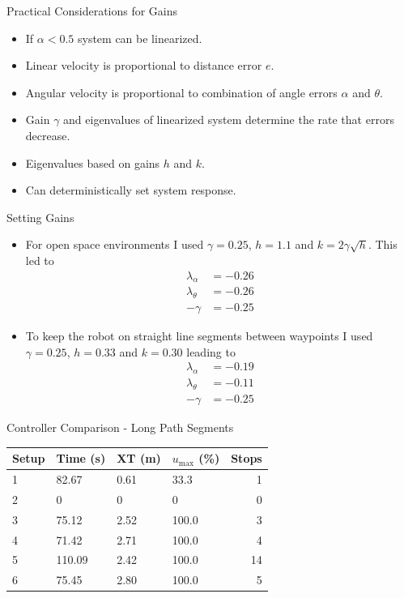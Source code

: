 \documentclass[hyperref={pdfpagelabels=false}]{beamer}
\begin{document}
\begin{frame}{Practical Considerations for Gains}
\begin{itemize}
\item If $\alpha < 0.5$ system can be linearized.
\item Linear velocity is proportional to distance error $e$.
\item Angular velocity is proportional to combination of angle errors $\alpha$ and $\theta$.
\item Gain $\gamma$ and eigenvalues of linearized system determine the rate that errors decrease.
\item Eigenvalues based on gains $h$ and $k$.
\item Can deterministically set system response.
\end{itemize}
\end{frame}

\begin{frame}{Setting Gains}
\begin{itemize}
\item For open space environments I used $\gamma=0.25$, $h=1.1$ and $k=2\gamma\sqrt{h}$. This led to
\begin{align*}
\lambda_{\alpha} &= -0.26 \\
\lambda_{\theta} &= -0.26 \\
-\gamma &= -0.25
\end{align*}
\item To keep the robot on straight line segments between waypoints I used $\gamma=0.25$, $h=0.33$ and $k=0.30$ leading to
\begin{align*}
\lambda_{\alpha} &= -0.19 \\
\lambda_{\theta} &= -0.11 \\
-\gamma &= -0.25
\end{align*}
\end{itemize}
\end{frame}

\begin{frame}{Controller Comparison - Long Path Segments}
\begin{table}[ht!]
\small
\centering
\begin{tabular}{@{}llllr@{}} \toprule
Setup & Time (s) & XT (m) & $u_{\text{max}}$ (\%) & Stops \\ \midrule
1     & 82.67    & 0.61   & 33.3                  & 1     \\
2     & 0        & 0      & 0                     & 0     \\
3     & 75.12    & 2.52   & 100.0                 & 3     \\
4     & 71.42    & 2.71   & 100.0                 & 4     \\
5     & 110.09   & 2.42   & 100.0                 & 14    \\
6     & 75.45    & 2.80   & 100.0                 & 5     \\ \bottomrule
\end{tabular}
\end{table}
\end{frame}
\end{document}
